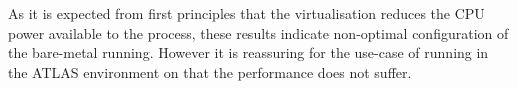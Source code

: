As it is expected from first principles that the virtualisation
reduces the CPU power available to the process, these results indicate
non-optimal configuration of the bare-metal running. However it is
reassuring for the use-case of running in the ATLAS environment on
\NEMO that the performance does not suffer.



%
%

